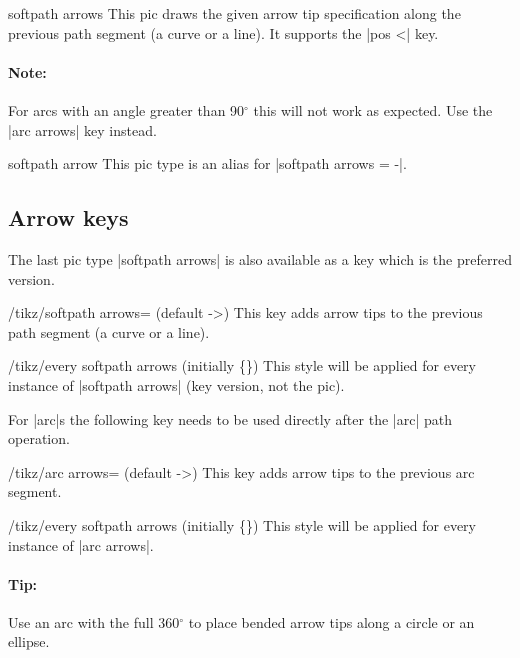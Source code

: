 \begin{multicols}{2}
\begin{pictype}{softpath arrows}{}
  This pic draws the given arrow tip specification along the previous path segment (a curve or a line).
  It supports the |pos <| key.
  
  \paragraph{Note:} For arcs with an angle greater than 90${}^\circ$
    this will not work as expected. Use the |arc arrows| key instead.
\end{pictype}
\begin{pictype}{softpath arrow}{}
  This pic type is an alias for |softpath arrows = -|.
\end{pictype}

\subsection{Arrow keys}
The last pic type |softpath arrows| is also available as a key
which is the preferred version.
\begin{key}{/tikz/softpath arrows= (default ->)}
This key adds arrow tips to the previous path segment (a curve or a line).

\begin{stylekey}{/tikz/every softpath arrows (initially \{\})}
This style will be applied for every instance of |softpath arrows| (key version, not the pic).
\end{stylekey}
\end{key}

For |arc|s the following key needs to be used directly after the |arc| path operation.
\begin{key}{/tikz/arc arrows= (default ->)}
This key adds arrow tips to the previous arc segment.
\begin{stylekey}{/tikz/every softpath arrows (initially \{\})}
This style will be applied for every instance of |arc arrows|.
\end{stylekey}

\paragraph{Tip:}
Use an arc with the full 360${}^\circ$ to place bended arrow tips along a circle or an ellipse.
\end{key}

\end{multicols}
